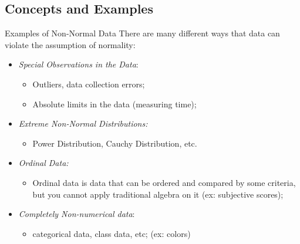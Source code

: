 \subsection{Concepts and Examples}

\begin{frame}{Examples of Non-Normal Data}
  There are many different ways that data can violate the assumption of normality:\bigskip

  \begin{itemize}
    \item \emph{Special Observations in the Data}:
      \begin{itemize}
        \item Outliers, data collection errors;
        \item Absolute limits in the data (measuring time);
      \end{itemize}

    \item \emph{Extreme Non-Normal Distributions:}
    \begin{itemize}
      \item Power Distribution, Cauchy Distribution, etc.
    \end{itemize}

    \item \emph{Ordinal Data:}
    \begin{itemize}
      \item Ordinal data is data that can be ordered and compared by some criteria, but you cannot apply traditional algebra on it (ex: subjective scores);
    \end{itemize}

    \item \emph{Completely Non-numerical data}:
    \begin{itemize}
      \item categorical data, class data, etc; (ex: colors)
    \end{itemize}
  \end{itemize}
\end{frame}


